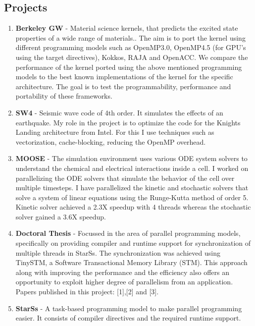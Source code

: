 \documentclass[margin]{res}
\begin{document}
\begin{resume}
\section{Projects}
\begin{enumerate}
%
        \item { \bf Berkeley GW} -
        Material science kernels, that predicts the excited state properties of a wide range of materials..
        The aim is to port the kernel using different programming models such as OpenMP3.0, OpenMP4.5 (for GPU's using the target directives), Kokkos, RAJA and OpenACC.
        We compare the performance of the kernel ported using the above mentioned programming models to the best known implementations of the kernel for the specific architecture.
        The goal is to test the programmability, performance and portability of these frameworks.
    \item {\bf SW4} -
            Seismic wave code of 4th order.
            It simulates the effects of an earthquake.%
            My role in the project is to optimize the code for the Knights Landing architecture from Intel.
            For this I use techniques such as vectorization, cache-blocking, reducing the OpenMP overhead.
%
	   \item {\bf MOOSE } -
             The simulation environment uses various ODE system solvers to understand the chemical and electrical interactions inside a cell.
			 I worked on parallelizing the ODE solvers that simulate the behavior of the cell over multiple timesteps.
			 I have parallelized the kinetic and stochastic solvers that solve a system of linear equations using the Runge-Kutta method of order 5.
			 Kinetic solver achieved a 2.3X speedup with 4 threads whereas the stochastic solver gained a 3.6X speedup.
%
	   \item {\bf Doctoral Thesis} -
			 Focussed in the area of parallel programming models, specifically on providing compiler and runtime support for synchronization of multiple threads in StarSs.
			 The synchronization was achieved using TinySTM, a Software Transactional Memory Library (STM).
			 This approach along with improving the performance and the efficiency also offers an opportunity to exploit higher degree of parallelism from an application.
			 Papers published in this project: [1],[2] and [3].
%
	   \item {\bf StarSs} -
			 A task-based programming model to make parallel programming easier. It consists of compiler directives and the required runtime support.

\end{enumerate}
\end{resume}
\end{document}
